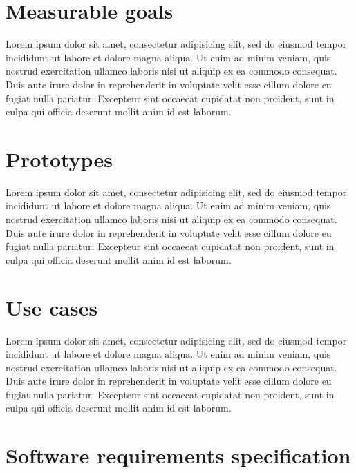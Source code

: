 \documentclass{article}
\begin{document}
\section{Measurable goals}
Lorem ipsum dolor sit amet, consectetur adipisicing elit, sed do eiusmod tempor incididunt ut labore et dolore magna aliqua. Ut enim ad minim veniam, quis nostrud exercitation ullamco laboris nisi ut aliquip ex ea commodo consequat. Duis aute irure dolor in reprehenderit in voluptate velit esse cillum dolore eu fugiat nulla pariatur. Excepteur sint occaecat cupidatat non proident, sunt in culpa qui officia deserunt mollit anim id est laborum.
\section{Prototypes}
Lorem ipsum dolor sit amet, consectetur adipisicing elit, sed do eiusmod tempor incididunt ut labore et dolore magna aliqua. Ut enim ad minim veniam, quis nostrud exercitation ullamco laboris nisi ut aliquip ex ea commodo consequat. Duis aute irure dolor in reprehenderit in voluptate velit esse cillum dolore eu fugiat nulla pariatur. Excepteur sint occaecat cupidatat non proident, sunt in culpa qui officia deserunt mollit anim id est laborum.
\section{Use cases}
Lorem ipsum dolor sit amet, consectetur adipisicing elit, sed do eiusmod tempor incididunt ut labore et dolore magna aliqua. Ut enim ad minim veniam, quis nostrud exercitation ullamco laboris nisi ut aliquip ex ea commodo consequat. Duis aute irure dolor in reprehenderit in voluptate velit esse cillum dolore eu fugiat nulla pariatur. Excepteur sint occaecat cupidatat non proident, sunt in culpa qui officia deserunt mollit anim id est laborum.
\section{Software requirements specification}
\end{document}
